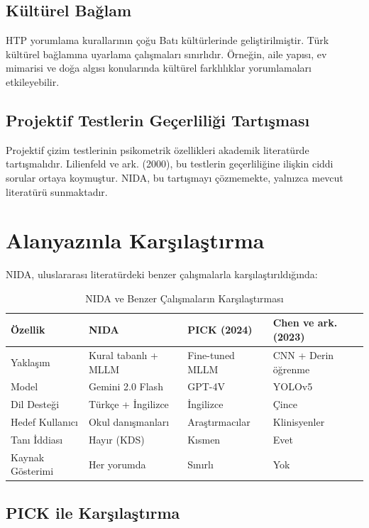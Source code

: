 \subsection{Kültürel Bağlam}

HTP yorumlama kurallarının çoğu Batı kültürlerinde geliştirilmiştir. Türk kültürel bağlamına uyarlama çalışmaları sınırlıdır. Örneğin, aile yapısı, ev mimarisi ve doğa algısı konularında kültürel farklılıklar yorumlamaları etkileyebilir.

\subsection{Projektif Testlerin Geçerliliği Tartışması}

Projektif çizim testlerinin psikometrik özellikleri akademik literatürde tartışmalıdır. Lilienfeld ve ark. (2000), bu testlerin geçerliliğine ilişkin ciddi sorular ortaya koymuştur. NIDA, bu tartışmayı çözmemekte, yalnızca mevcut literatürü sunmaktadır.

\section{Alanyazınla Karşılaştırma}

NIDA, uluslararası literatürdeki benzer çalışmalarla karşılaştırıldığında:

\begin{table}[H]
\centering
\caption{NIDA ve Benzer Çalışmaların Karşılaştırması}
\label{tab:karsilastirma}
\begin{tabular}{p{3cm}p{3cm}p{3cm}p{3.5cm}}
\toprule
\textbf{Özellik} & \textbf{NIDA} & \textbf{PICK (2024)} & \textbf{Chen ve ark. (2023)} \\
\midrule
Yaklaşım & Kural tabanlı + MLLM & Fine-tuned MLLM & CNN + Derin öğrenme \\
Model & Gemini 2.0 Flash & GPT-4V & YOLOv5 \\
Dil Desteği & Türkçe + İngilizce & İngilizce & Çince \\
Hedef Kullanıcı & Okul danışmanları & Araştırmacılar & Klinisyenler \\
Tanı İddiası & Hayır (KDS) & Kısmen & Evet \\
Kaynak Gösterimi & Her yorumda & Sınırlı & Yok \\
\bottomrule
\end{tabular}
\end{table}

\subsection{PICK ile Karşılaştırma}

